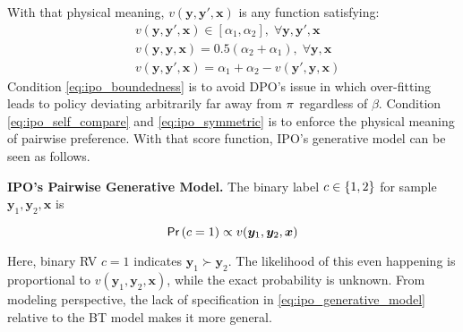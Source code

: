 \documentclass[11pt,a4paper]{article}
\begin{document}
With that physical meaning, $v(\bm{y}, \bm{y}', \bm{x})$ is any function satisfying:
\begin{subequations}
\begin{align}
&v(\bm{y}, \bm{y}', \bm{x}) \in [\alpha_1,\alpha_2], \; \forall  \bm{y}, \bm{y}', \bm{x} \label{eq:ipo_boundedness}\\
&v(\bm{y}, \bm{y}, \bm{x}) = 0.5(\alpha_2 + \alpha_1), \; \forall  \bm{y}, \bm{x} \label{eq:ipo_self_compare}\\
&v(\bm{y}, \bm{y}', \bm{x}) = \alpha_1 + \alpha_2 - v(\bm{y}', \bm{y}, \bm{x}) \label{eq:ipo_symmetric}
\end{align}
\end{subequations}
Condition \eqref{eq:ipo_boundedness} is to avoid DPO's issue in which over-fitting leads to policy deviating arbitrarily far away from $\pi_{\rm }$ regardless of $\beta$. Condition \eqref{eq:ipo_self_compare} and \eqref{eq:ipo_symmetric} is to enforce the physical meaning of pairwise preference.
With that score function, IPO's generative model can be seen as follows.

\textbf{IPO's Pairwise Generative Model.} The binary label $c \in \left\{1, 2\right\}$ for sample $\bm{y}_1, \bm{y}_2, \bm{x}$ is
\begin{tcolorbox}[center]
\begin{equation}
\label{eq:ipo_generative_model}
\textsf{Pr}\left(c=1\right) \propto v(\bm{y}_1, \bm{y}_2, \bm{x})
\end{equation} 
\end{tcolorbox}
Here, binary RV $c=1$ indicates $\bm{y}_1 \succ \bm{y}_2$. The likelihood of this even happening is proportional to $v(\bm{y}_1, \bm{y}_2, \bm{x})$, while the exact probability is unknown. From modeling perspective, the lack of specification in \eqref{eq:ipo_generative_model} relative to the BT model makes it more general.


\end{document}
